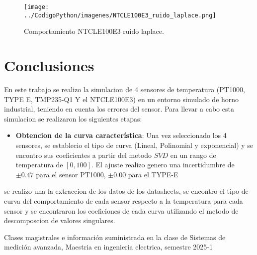 \documentclass[conference]{IEEEtran}
\begin{document}
\begin{figure}[h!]
	\centering
	\texttt{[image: ../CodigoPython/imagenes/NTCLE100E3\_ruido\_laplace.png]}
	\caption{Comportamiento NTCLE100E3 ruido laplace.}
	\label{fig:NTCLE100E3_ruido_laplace}
\end{figure}

\section{Conclusiones}

En este trabajo se realizo la simulacion de 4 sensores de temperatura (PT1000, TYPE E, TMP235-Q1 Y el NTCLE100E3) en un entorno simulado de horno industrial, teniendo en cuenta los errores del sensor. Para llevar a cabo esta simulacion se realizaron los siguientes etapas:

\begin{itemize}
	\item \textbf{Obtencion de la curva caracter\'istica}: Una vez seleccionado los 4 sensores, se establecio el tipo de curva (Lineal, Polinomial y exponencial) y se encontro sus coeficientes a partir del metodo $SVD$ en un rango de temperatura de $[0, 100]$. El ajuste realizo genero una incertidumbre de $\pm 0.47$ para el sensor PT1000, $\pm 0.00$ para el TYPE-E
\end{itemize}

se realizo una la extraccion de los datos de los datasheets, se encontro el tipo de curva del comportamiento de cada sensor respecto a la temperatura para cada sensor y se encontraron los coeficiones de cada curva utilizando el metodo de descomposcion de valores singulares.

\begin{thebibliography}{00}

\item Clases magistrales e información suministrada en la clase de Sistemas de medición avanzada, Maestria en ingenieria electrica, semestre 2025-1

\end{thebibliography}
\end{document}
